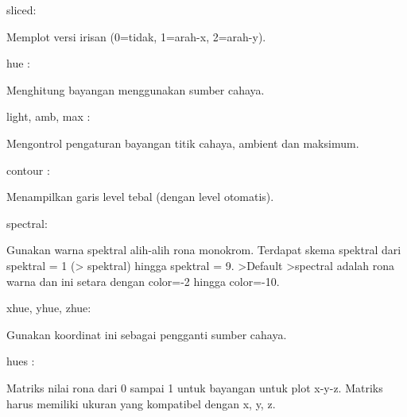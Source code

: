 \documentclass{article}
\begin{document}
\begin{eulernotebook}
\begin{eulercomment}
\begin{eulercomment}
\begin{eulercomment}
\begin{eulercomment}
\begin{eulercomment}
\begin{eulercomment}
\begin{eulercomment}
sliced:\\
\end{eulercomment}
\begin{eulerttcomment}
  Memplot versi irisan (0=tidak, 1=arah-x, 2=arah-y).
\end{eulerttcomment}
\begin{eulercomment}
hue :\\
\end{eulercomment}
\begin{eulerttcomment}
  Menghitung bayangan menggunakan sumber cahaya.
\end{eulerttcomment}
\begin{eulercomment}
light, amb, max :\\
\end{eulercomment}
\begin{eulerttcomment}
  Mengontrol pengaturan bayangan titik cahaya, ambient dan maksimum.
\end{eulerttcomment}
\begin{eulercomment}
contour  :\\
\end{eulercomment}
\begin{eulerttcomment}
  Menampilkan garis level tebal (dengan level otomatis).
\end{eulerttcomment}
\begin{eulercomment}
spectral:\\
\end{eulercomment}
\begin{eulerttcomment}
  Gunakan warna spektral alih-alih rona monokrom. Terdapat
  skema spektral dari spektral = 1 (> spektral) hingga spektral = 9.
  >Default >spectral adalah rona warna dan ini setara dengan
  color=-2 hingga color=-10.
\end{eulerttcomment}
\begin{eulercomment}
xhue, yhue, zhue:\\
\end{eulercomment}
\begin{eulerttcomment}
  Gunakan koordinat ini sebagai pengganti sumber cahaya.
\end{eulerttcomment}
\begin{eulercomment}
hues :\\
\end{eulercomment}
\begin{eulerttcomment}
  Matriks nilai rona dari 0 sampai 1 untuk bayangan untuk plot x-y-z.
  Matriks harus memiliki ukuran yang kompatibel dengan x, y, z.
\end{eulerttcomment}

\end{eulercomment}
\end{eulercomment}
\end{eulercomment}
\end{eulercomment}
\end{eulercomment}
\end{eulercomment}
\end{eulernotebook}
\end{document}
